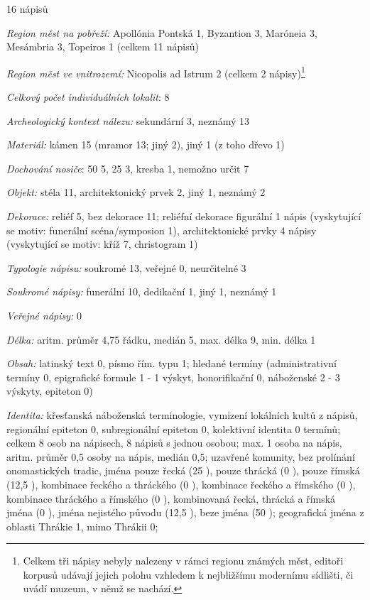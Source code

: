 \placetable[none]{}
\starttable[|l|]
\HL
{} 16 nápisů

{\em Region měst na pobřeží:} Apollónia Pontská 1, Byzantion 3, Maróneia 3, Mesámbria 3, Topeiros 1 (celkem 11 nápisů)

{\em Region měst ve vnitrozemí:} Nicopolis ad Istrum 2 (celkem 2 nápisy)\footnote{Celkem tři nápisy nebyly nalezeny v rámci regionu známých měst, editoři korpusů udávají jejich polohu vzhledem k nejbližšímu modernímu sídlišti, či uvádí muzeum, v němž se nachází.}

{\em Celkový počet individuálních lokalit}: 8

{\em Archeologický kontext nálezu:} sekundární 3, neznámý 13

{\em Materiál:} kámen 15 (mramor 13; jiný 2), jiný 1 (z toho dřevo 1)

{\em Dochování nosiče}: 50  5, 25  3, kresba 1, nemožno určit 7

{\em Objekt:} stéla 11, architektonický prvek 2, jiný 1, neznámý 2

{\em Dekorace:} reliéf 5, bez dekorace 11; reliéfní dekorace figurální 1 nápis (vyskytující se motiv: funerální scéna/symposion 1), architektonické prvky 4 nápisy (vyskytující se motiv: kříž 7, christogram 1)

{\em Typologie nápisu:} soukromé 13, veřejné 0, neurčitelné 3

{\em Soukromé nápisy:} funerální 10, dedikační 1, jiný 1, neznámý 1

{\em Veřejné nápisy:} 0

{\em Délka:} aritm. průměr 4,75 řádku, medián 5, max. délka 9, min. délka 1

{\em Obsah:} latinský text 0, písmo řím. typu 1; hledané termíny (administrativní termíny 0, epigrafické formule 1 - 1 výskyt, honorifikační 0, náboženské 2 - 3 výskyty, epiteton 0)

{\em Identita:} křesťanská náboženská terminologie, vymizení lokálních kultů z nápisů, regionální epiteton 0, subregionální epiteton 0, kolektivní identita 0 termínů; celkem 8 osob na nápisech, 8 nápisů s jednou osobou; max. 1 osoba na nápis, aritm. průměr 0,5 osoby na nápis, medián 0,5; uzavřené komunity, bez prolínání onomastických tradic, jména pouze řecká (25 ), pouze thrácká (0 ), pouze římská (12,5 ), kombinace řeckého a thráckého (0 ), kombinace řeckého a římského (0 ), kombinace thráckého a římského (0 ), kombinovaná řecká, thrácká a římská jména (0 ), jména nejistého původu (12,5 ), beze jména (50 ); geografická jména z oblasti Thrákie 1, mimo Thrákii 0;

